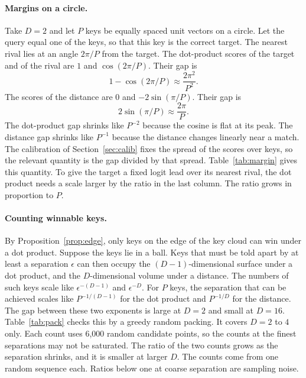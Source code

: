 \documentclass[11pt]{article}
\begin{document}
\paragraph{Margins on a circle.}
Take $D=2$ and let $P$ keys be equally spaced unit vectors on a circle.
Let the query equal one of the keys, so that this key is the correct target.
The nearest rival lies at an angle $2\pi/P$ from the target.
The dot-product scores of the target and of the rival are $1$ and $\cos(2\pi/P)$.
Their gap is
\begin{equation}
1-\cos(2\pi/P)\approx\frac{2\pi^2}{P^2}.
\end{equation}
The scores of the distance are $0$ and $-2\sin(\pi/P)$.
Their gap is
\begin{equation}
2\sin(\pi/P)\approx\frac{2\pi}{P}.
\end{equation}
The dot-product gap shrinks like $P^{-2}$ because the cosine is flat at its peak.
The distance gap shrinks like $P^{-1}$ because the distance changes linearly near a match.
The calibration of Section~\ref{sec:calib} fixes the spread of the scores over keys, so the relevant quantity is the gap divided by that spread.
Table~\ref{tab:margin} gives this quantity.
To give the target a fixed logit lead over its nearest rival, the dot product needs a scale larger by the ratio in the last column.
The ratio grows in proportion to $P$.

\begin{table}[h]
\centering\small

\caption{Score gap between a key and its nearest rival, divided by the standard deviation of the scores over all keys, for $P$ equally spaced unit vectors on a circle. The last column is the ratio of the distance value to the dot-product value.}
\label{tab:margin}
\end{table}

\paragraph{Counting winnable keys.}
By Proposition~\ref{prop:edge}, only keys on the edge of the key cloud can win under a dot product.
Suppose the keys lie in a ball.
Keys that must be told apart by at least a separation $\epsilon$ can then occupy the $(D-1)$-dimensional surface under a dot product, and the $D$-dimensional volume under a distance.
The numbers of such keys scale like $\epsilon^{-(D-1)}$ and $\epsilon^{-D}$.
For $P$ keys, the separation that can be achieved scales like $P^{-1/(D-1)}$ for the dot product and $P^{-1/D}$ for the distance.
The gap between these two exponents is large at $D=2$ and small at $D=16$.
Table~\ref{tab:pack} checks this by a greedy random packing. It covers $D=2$ to $4$ only. Each count uses 6,000 random candidate points, so the counts at the finest separations may not be saturated.
The ratio of the two counts grows as the separation shrinks, and it is smaller at larger $D$.
The counts come from one random sequence each.
Ratios below one at coarse separation are sampling noise.
\end{document}
